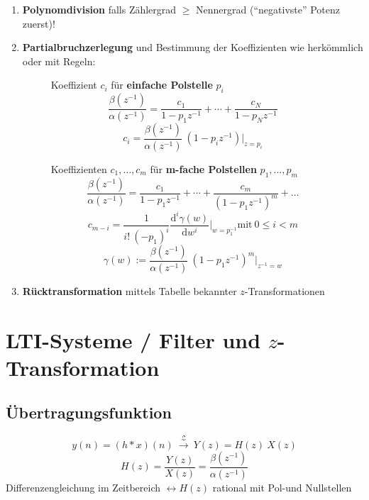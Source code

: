 \documentclass[10pt,a4paper]{article}
\newcommand{\ztransform}{
	~\xrightarrow{~\mathcal{Z}~}~
}
\begin{document}
\begin{enumerate}
\item \textbf{Polynomdivision} falls Zählergrad $\geq$ Nennergrad (``negativste'' Potenz zuerst)!
\item \textbf{Partialbruchzerlegung} und Bestimmung der Koeffizienten wie herkömmlich oder mit Regeln:
\begin{figure}[H]
	\centering
	\setlength{\fboxsep}{10pt}
	\begin{adjustbox}{valign=t,center=0.42\textwidth,margin=1ex,minipage=[t][][t]{0.37\textwidth},bgcolor=white,cfbox=black 1.5pt 0pt 1pt}
		Koeffizient $c_i$ für \textbf{einfache Polstelle} $p_i$
		\[ \frac{\beta(z^{-1})}{\alpha(z^{-1})} = \frac{c_1}{1 - p_1 z^{-1}} + \cdots + \frac{c_N}{1 - p_N z^{-1}} \]
		\[ c_i = \frac{\beta(z^{-1})}{\alpha(z^{-1})} ~ (1 - p_i z^{-1}) \bigg |_{z = p_{i}} \]
		\vspace{3.8em}
	\end{adjustbox}
	\begin{adjustbox}{valign=t,center=0.48\textwidth,margin=1ex,minipage=[t][][t]{0.43\textwidth},bgcolor=white,cfbox=black 1.5pt 0pt 1pt}
		Koeffizienten $c_1, \ldots, c_m$ für \textbf{m-fache Polstellen} $p_1, \ldots, p_m$
		\[ \frac{\beta(z^{-1})}{\alpha(z^{-1})}=\frac{c_{1}}{1-p_{1}z^{-1}}+\cdots+\frac{c_{m}}{(1-p_{1}z^{-1})^m} + \ldots \]
		\[ c_{m - i} = \frac{1}{i! ~ (-p_1)^{i}}\frac{\mathrm d^{i} \gamma(w)}{\mathrm d w^{i}} \bigg |_{w = p_1^{-1}} \text{mit} ~ 0 \leq i < m \]
		\[ \gamma(w) := \frac{\beta(z^{-1})}{\alpha(z^{-1})} ~ \left(1 - p_1 z^{-1} \right)^m \bigg |_{z^{-1} = w} \]
	\end{adjustbox}
\end{figure}

\item \textbf{Rücktransformation} mittels Tabelle bekannter $z$-Transformationen

\end{enumerate}

\section*{LTI-Systeme / Filter und $z$-Transformation}
\subsection*{Übertragungsfunktion}
\[
	y(n) = (h * x)(n) \ztransform Y(z) = H(z) ~ X(z)
\]
\[
	H(z) = \frac{Y(z)}{X(z)} = \frac{\beta(z^{-1})}{\alpha(z^{-1})}
\]
	Differenzengleichung im Zeitbereich $\leftrightarrow H(z)$ rational mit Pol-und Nullstellen\\
\end{document}
